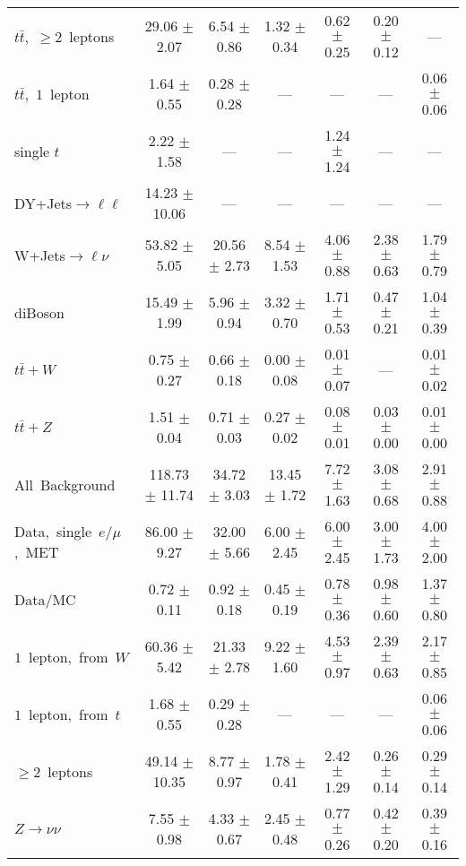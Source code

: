 \documentclass{article}
\begin{document}
\begin{longtable}{|l|c|c|c|c|c|c|}
$t\bar{t}$,~$\ge2$~leptons & 29.06 $\pm$ 2.07  & 6.54 $\pm$ 0.86  & 1.32 $\pm$ 0.34  & 0.62 $\pm$ 0.25  & 0.20 $\pm$ 0.12  & --- \\* 
$t\bar{t}$,~$1$~lepton & 1.64 $\pm$ 0.55  & 0.28 $\pm$ 0.28  & ---  & ---  & ---  & 0.06 $\pm$ 0.06 \\* 
single $t$  & 2.22 $\pm$ 1.58  & ---  & ---  & 1.24 $\pm$ 1.24  & ---  & --- \\* 
DY+Jets$\rightarrow\ell\ell$  & 14.23 $\pm$ 10.06  & ---  & ---  & ---  & ---  & --- \\* 
W+Jets$\rightarrow\ell\nu$  & 53.82 $\pm$ 5.05  & 20.56 $\pm$ 2.73  & 8.54 $\pm$ 1.53  & 4.06 $\pm$ 0.88  & 2.38 $\pm$ 0.63  & 1.79 $\pm$ 0.79 \\* 
diBoson  & 15.49 $\pm$ 1.99  & 5.96 $\pm$ 0.94  & 3.32 $\pm$ 0.70  & 1.71 $\pm$ 0.53  & 0.47 $\pm$ 0.21  & 1.04 $\pm$ 0.39 \\* 
$t\bar{t}+W$  & 0.75 $\pm$ 0.27  & 0.66 $\pm$ 0.18  & 0.00 $\pm$ 0.08  & 0.01 $\pm$ 0.07  & ---  & 0.01 $\pm$ 0.02 \\* 
$t\bar{t}+Z$  & 1.51 $\pm$ 0.04  & 0.71 $\pm$ 0.03  & 0.27 $\pm$ 0.02  & 0.08 $\pm$ 0.01  & 0.03 $\pm$ 0.00  & 0.01 $\pm$ 0.00 \\* 
\hline \hline 
All~Background  & 118.73 $\pm$ 11.74  & 34.72 $\pm$ 3.03  & 13.45 $\pm$ 1.72  & 7.72 $\pm$ 1.63  & 3.08 $\pm$ 0.68  & 2.91 $\pm$ 0.88 \\* 
Data,~single~$e/\mu$,~MET  & 86.00 $\pm$ 9.27  & 32.00 $\pm$ 5.66  & 6.00 $\pm$ 2.45  & 6.00 $\pm$ 2.45  & 3.00 $\pm$ 1.73  & 4.00 $\pm$ 2.00 \\* 
Data/MC  & 0.72 $\pm$ 0.11  & 0.92 $\pm$ 0.18  & 0.45 $\pm$ 0.19  & 0.78 $\pm$ 0.36  & 0.98 $\pm$ 0.60  & 1.37 $\pm$ 0.80 \\* 
\hline \hline 
$1$~lepton,~from~$W$  & 60.36 $\pm$ 5.42  & 21.33 $\pm$ 2.78  & 9.22 $\pm$ 1.60  & 4.53 $\pm$ 0.97  & 2.39 $\pm$ 0.63  & 2.17 $\pm$ 0.85 \\* 
$1$~lepton,~from~$t$  & 1.68 $\pm$ 0.55  & 0.29 $\pm$ 0.28  & ---  & ---  & ---  & 0.06 $\pm$ 0.06 \\* 
$\ge2$~leptons  & 49.14 $\pm$ 10.35  & 8.77 $\pm$ 0.97  & 1.78 $\pm$ 0.41  & 2.42 $\pm$ 1.29  & 0.26 $\pm$ 0.14  & 0.29 $\pm$ 0.14 \\* 
$Z\rightarrow\nu\nu$  & 7.55 $\pm$ 0.98  & 4.33 $\pm$ 0.67  & 2.45 $\pm$ 0.48  & 0.77 $\pm$ 0.26  & 0.42 $\pm$ 0.20  & 0.39 $\pm$ 0.16 \\* 
\hline 
\end{longtable} 
\end{document}
